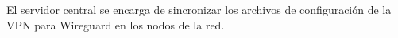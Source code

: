 El servidor central se encarga de sincronizar los archivos de configuración de la VPN para Wireguard en los nodos de la red.